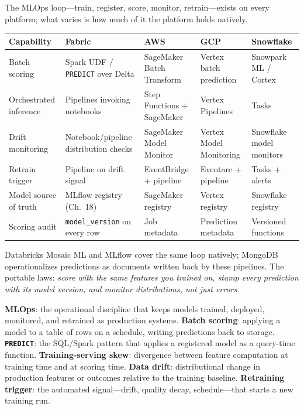 \begin{crosscloud}
The MLOps loop---train, register, score, monitor, retrain---exists on every platform; what varies is how much of it the platform holds natively.

\vspace{2mm}
{\footnotesize
\begin{tabular}{@{}p{2.8cm}p{3.2cm}p{3.2cm}p{3.2cm}p{3.2cm}@{}}
\toprule
\textbf{Capability} & \textbf{Fabric} & \textbf{AWS} & \textbf{GCP} & \textbf{Snowflake} \\
\midrule
Batch scoring & Spark UDF / \texttt{PREDICT} over Delta & SageMaker Batch Transform & Vertex batch prediction & Snowpark ML / Cortex \\
Orchestrated inference & Pipelines invoking notebooks & Step Functions + SageMaker & Vertex Pipelines & Tasks \\
Drift monitoring & Notebook/pipeline distribution checks & SageMaker Model Monitor & Vertex Model Monitoring & Snowflake model monitors \\
Retrain trigger & Pipeline on drift signal & EventBridge + pipeline & Eventarc + pipeline & Tasks + alerts \\
Model source of truth & MLflow registry (Ch.~18) & SageMaker registry & Vertex registry & Snowflake registry \\
Scoring audit & \texttt{model\_version} on every row & Job metadata & Prediction metadata & Versioned functions \\
\bottomrule
\end{tabular}}

\vspace{1mm}
Databricks Mosaic ML and MLflow cover the same loop natively; MongoDB operationalizes predictions as documents written back by these pipelines. The portable laws: \emph{score with the same features you trained on, stamp every prediction with its model version, and monitor distributions, not just errors}.
\end{crosscloud}

\begin{keyterms}
\textbf{MLOps}: the operational discipline that keeps models trained, deployed, monitored, and retrained as production systems. \quad
\textbf{Batch scoring}: applying a model to a table of rows on a schedule, writing predictions back to storage. \quad
\textbf{\texttt{PREDICT}}: the SQL/Spark pattern that applies a registered model as a query-time function. \quad
\textbf{Training-serving skew}: divergence between feature computation at training time and at scoring time. \quad
\textbf{Data drift}: distributional change in production features or outcomes relative to the training baseline. \quad
\textbf{Retraining trigger}: the automated signal---drift, quality decay, schedule---that starts a new training run.
\end{keyterms}

